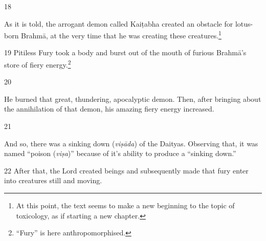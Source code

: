 \begin{translation}
\item [18]

As it is told, the arrogant demon called Kaiṭabha created an obstacle for
lotus-born Brahmā, at the very time that he was creating these creatures.\footnote{At 
this point, the text seems to make a new beginning to the topic of toxicology, as if 
starting a new chapter.}

\item[19]
Pitiless Fury took a body and burst out of the mouth of furious Brahmā's store of fiery 
energy.\footnote{“Fury” is here anthropomorphised.}

\item[20]

He burned that great, thundering, apocalyptic demon.   Then, after bringing about
the annihilation of that demon,  his amazing fiery energy increased.

\item [21]

And so, there was a sinking down (\emph{viṣāda}) of the Daityas.   Observing that, it 
was named “poison (\emph{viṣa})” because of it's ability to produce a “sinking down.” 

\item [22] After that, the Lord created beings and subsequently made that fury
enter into creatures still and moving.





\end{translation}